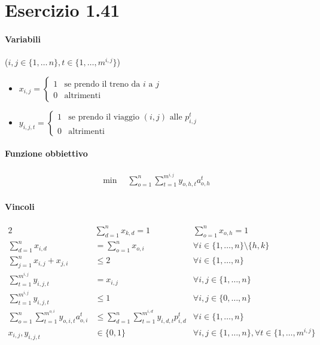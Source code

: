 \documentclass{article}
\begin{document}
\pagebreak
\section{Esercizio 1.41}

\paragraph{Variabili} ($i,j \in \{1,\ldots\,n\}, t \in \{1,\ldots,m^{i,j}\}$)
\begin{itemize}
  \item $x_{i,j} = \begin{cases}
    1 &\text{se prendo il treno da }i\text{ a }j\\
    0 &\text{altrimenti}
  \end{cases}$
  \item $y_{i,j,t} = \begin{cases}
    1 &\text{se prendo il viaggio }(i,j)\text{ alle }p_{i,j}^{t}\\
    0 &\text{altrimenti}
  \end{cases}$
\end{itemize}

\paragraph{Funzione obbiettivo}
\begin{align*}
  \min \quad \sum_{o=1}^n \sum_{t=1}^{m^{i,j}} y_{o,h,t} a_{o,h}^t
\end{align*}

\paragraph{Vincoli}
\begin{alignat}{2}
  &\sum_{d=1}^n x_{k,d} = 1 &\sum_{o=1}^n x_{o,h} = 1\\
  \sum_{d=1}^n x_{i,d} &= \sum_{o=1}^n x_{o,i} &\forall i \in \{1,\ldots,n\} \setminus \{h,k\}\\
  \sum_{j=1}^n x_{i,j} + x_{j,i} &\leq 2 &\forall i \in \{1,\ldots,n\}\\
  \sum_{t=1}^{m^{i,j}} y_{i,j,t} &= x_{i,j} &\forall i,j \in \{1,\ldots,n\}\\
  \sum_{t=1}^{m^{i,j}} y_{i,j,t} &\leq 1 &\forall i,j \in \{0,\ldots,n\}\\
  \sum_{o=1}^n \sum_{t=1}^{m^{o,i}} y_{o,i,t} a_{o,i}^t &\leq \sum_{d=1}^n \sum_{t=1}^{m^{i,d}} y_{i,d,t} p_{i,d}^t &\forall i \in \{1,\ldots,n\}\\
  x_{i,j}, y_{i,j,t} &\in \{0,1\} \quad &\forall i,j \in \{1,\ldots,n\}, \forall t \in \{1,\ldots,m^{i,j}\}
\end{alignat}
\end{document}
